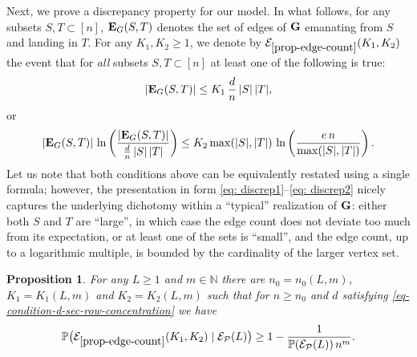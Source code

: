 \documentclass[12pt]{article}
\newtheorem{prop}[theorem]{Proposition}
\theoremstyle{definition}
\theoremstyle{plain}
\newcommand{\N}{\mathbb{N}}
\newcommand{\Event}{\mathcal{E}}
\def\nrangr{G}
\def\rangr{{\bf{}G}}
\def\edg{{\bf E}_{\nrangr}}
\def\Prob{{\mathbb P}}
\def\pvector{{\mathcal P}}
\begin{document}
Next, we prove a discrepancy property for our model.
In what follows, for any subsets $S,T\subset[n]$, $\edg(S,T)$ denotes the set of edges of $\rangr$ emanating from $S$ and landing in $T$.
For any $K_1,K_2\geq 1$, we denote by $\Event_{\ref{prop-edge-count}}(K_1,K_2)$ the event that
for {\it all} subsets $S,T\subset [n]$ at least one of the following is true: 
\begin{equation}\label{eq: discrep1}
\vert \edg(S,T)\vert\leq K_1\,\frac{d}{n}\, \vert S\vert \, \vert T\vert,
\end{equation}
or 
\begin{equation}\label{eq: discrep2}
\vert \edg(S,T)\vert\, \ln\bigg(\frac{\vert \edg(S,T)\vert}{ \frac{d}{n}\, 
\vert S\vert \, \vert T\vert}\bigg)\leq K_2\max(\vert S\vert, \vert T\vert)\, 
\ln\left(\frac{e\,n}{\max(\vert S\vert,\vert T\vert)}\right).
\end{equation}
Let us note that both conditions above can be equivalently restated using a single formula; however,
the presentation in form \eqref{eq: discrep1}--\eqref{eq: discrep2} nicely captures the underlying dichotomy
within a ``typical'' realization of $\rangr$:
either both $S$ and $T$ are ``large'', in which case the edge count does not deviate too much from its expectation,
or at least one of the sets is ``small'', and the edge count, up to a logarithmic multiple, is bounded by the cardinality
of the larger vertex set.

\begin{prop}\label{prop-edge-count}
For any $L\geq 1$ and $m\in\N$ there are $n_0=n_0(L,m)$, $K_1=K_1(L,m)$ and $K_2=K_2(L,m)$
such that for $n\geq n_0$ and $d$ satisfying \eqref{eq-condition-d-sec-row-concentration}
we have
$$
\Prob\big(\Event_{\ref{prop-edge-count}}(K_1,K_2)\mid \Event_{\pvector}(L)\big)
\geq 1-\frac{1}{\Prob(\Event_\pvector(L))\, n^{m}}.
$$
\end{prop}
\end{document}
